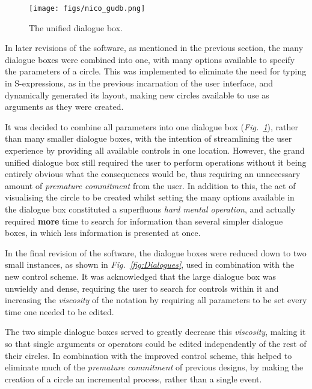 \documentclass[12pt,twoside,notitlepage,xetex]{report}
\begin{document}
{\begin{center}
\begin{figure}[H]
\begin{center}
\texttt{[image: figs/nico\_gudb.png]}
\end{center}
\caption{The unified dialogue box.}
\label{fig:GUDB}
\end{figure}
\end{center}

In later revisions of the software, as mentioned in the previous section, the many dialogue boxes were combined into one, with many options available to specify the parameters of a circle.  This was implemented to eliminate the need for typing in S-expressions, as in the previous incarnation of the user interface, and dynamically generated its layout, making new circles available to use as arguments as they were created.

It was decided to combine all parameters into one dialogue box (\emph{Fig.~\ref{fig:GUDB}}), rather than many smaller dialogue boxes, with the intention of streamlining the user experience by providing all available controls in one location.  However, the grand unified dialogue box still required the user to perform operations without it being entirely obvious what the consequences would be, thus requiring an unnecessary amount of \emph{premature commitment} from the user.  In addition to this, the act of visualising the circle to be created whilst setting the many options available in the dialogue box constituted a superfluous \emph{hard mental operation}, and actually required {\bf more} time to search for information than several simpler dialogue boxes, in which less information is presented at once.

In the final revision of the software, the dialogue boxes were reduced down to two small instances, as shown in \emph{Fig.~\ref{fig:Dialogues}}, used in combination with the new control scheme.  It was acknowledged that the large dialogue box was unwieldy and dense, requiring the user to search for controls within it and increasing the \emph{viscosity} of the notation by requiring all parameters to be set every time one needed to be edited.

The two simple dialogue boxes served to greatly decrease this \emph{viscosity}, making it so that single arguments or operators could be edited independently of the rest of their circles.  In combination with the improved control scheme, this helped to eliminate much of the \emph{premature commitment} of previous designs, by making the creation of a circle an incremental process, rather than a single event.

}
\end{document}

